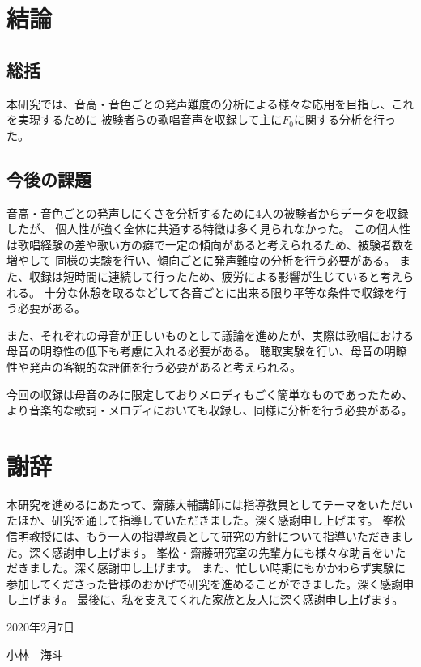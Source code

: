 \documentclass[10.5ptj,a4j,dvipdfmx,uplatex, oneside, openany]{jsbook}%
\begin{document}
\chapter{結論}
\section{総括}
本研究では、音高・音色ごとの発声難度の分析による様々な応用を目指し、これを実現するために
被験者らの歌唱音声を収録して主に$F_0$に関する分析を行った。

\section{今後の課題}

音高・音色ごとの発声しにくさを分析するために4人の被験者からデータを収録したが、
個人性が強く全体に共通する特徴は多く見られなかった。
この個人性は歌唱経験の差や歌い方の癖で一定の傾向があると考えられるため、被験者数を増やして
同様の実験を行い、傾向ごとに発声難度の分析を行う必要がある。
また、収録は短時間に連続して行ったため、疲労による影響が生じていると考えられる。
十分な休憩を取るなどして各音ごとに出来る限り平等な条件で収録を行う必要がある。


また、それぞれの母音が正しいものとして議論を進めたが、実際は歌唱における母音の明瞭性の低下も考慮に入れる必要がある。
聴取実験を行い、母音の明瞭性や発声の客観的な評価を行う必要があると考えられる。

今回の収録は母音のみに限定しておりメロディもごく簡単なものであったため、
より音楽的な歌詞・メロディにおいても収録し、同様に分析を行う必要がある。



\chapter*{謝辞}
本研究を進めるにあたって、齋藤大輔講師には指導教員としてテーマをいただいたほか、研究を通して指導していただきました。深く感謝申し上げます。
峯松信明教授には、もう一人の指導教員として研究の方針について指導いただきました。深く感謝申し上げます。
峯松・齋藤研究室の先輩方にも様々な助言をいただきました。深く感謝申し上げます。
また、忙しい時期にもかかわらず実験に参加してくださった皆様のおかげで研究を進めることができました。深く感謝申し上げます。
最後に、私を支えてくれた家族と友人に深く感謝申し上げます。

\begin{flushright}
2020年2月7日

小林　海斗
\end{flushright}
\end{document}
